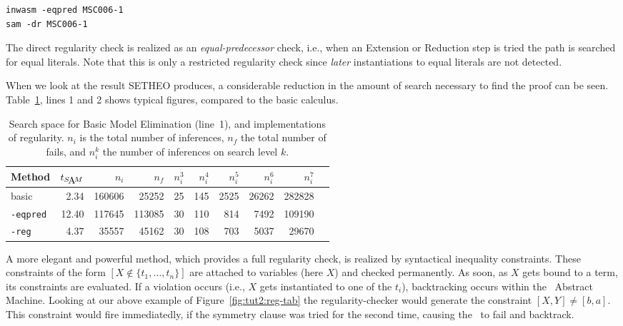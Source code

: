 \begin{center}
\begin{verbatim}
inwasm -eqpred MSC006-1
sam -dr MSC006-1
\end{verbatim}
\end{center}

The direct regularity check is realized as an {\em
equal-predecessor\/} check, i.e., when an Extension or Reduction step
is tried the path is searched for equal literals. Note that this is
only a restricted regularity check since {\em later\/} instantiations
to equal literals are not detected. 

When we look at the result SETHEO produces, a considerable 
reduction in the amount of search necessary to find the proof
can be seen.
Table~\ref{tab:tut2:results.regularity}, lines 1 and 2
shows typical figures, compared
to the basic calculus.

\begin{table}[htb]
\begin{center}
\begin{tabular}{|l|r|r|r||r|r|r|r|r|r|}
\hline
Method & $t_{\SAM}$ & $n_i$ & $n_f$ & 
	$n_i^3$ & $n_i^4$ & $n_i^5$ & $n_i^6$ & $n_i^7$ \\
\hline\hline
basic & 2.34 & 160606 & 25252 &
	25 & 145 & 2525 & 26262 & 282828 \\
\hline
{\tt -eqpred} & 12.40 & 117645 & 113085 &
	30 & 110 & 814 & 7492 & 109190 \\
\hline
{\tt -reg} & 4.37 & 35557 & 45162 &
	30 & 108 & 703 & 5037 & 29670 \\
\hline\hline
\end{tabular}
\end{center}
\caption{Search space for Basic Model Elimination (line~1), 
and implementations of regularity. $n_i$ is the total number of inferences,
$n_f$ the total number of fails, and $n^k_i$ the number of inferences
on search level $k$.}
\label{tab:tut2:results.regularity}
\end{table}


A more elegant and powerful method, which provides a full
regularity check, is realized by syntactical
inequality constraints. These constraints of the form
$ [ X \not\in \{t_1,\ldots,t_n\}] $  are attached to variables (here $X$)
and checked permanently. As soon, as $X$ gets bound to a term,
its constraints are evaluated. If a violation occurs (i.e.,
$X$ gets instantiated to one of the $t_i$), backtracking
occurs within the \SAM\ Abstract Machine.
Looking at our above example of Figure~\ref{fig:tut2:reg-tab}
the regularity-checker would
generate the constraint $[ X,Y ] \not = [ b,a ]$. This constraint
would fire immediatedly, if the symmetry clause was tried for the
second time, causing the \SAM\ to fail and backtrack.

